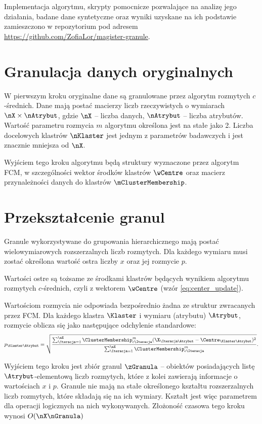 \documentclass[a4paper,twoside,12pt]{book}
\begin{document}
Implementacja algorytmu, skrypty pomocnicze pozwalające na analizę jego działania, badane dane syntetyczne oraz wyniki uzyskane na ich podstawie zamieszczono w repozytorium pod adresem \url{https://github.com/ZofiaLor/magister-granule}.

\section{Granulacja danych oryginalnych}
\label{sec:granulacja-danych-oryginalnych}

W pierwszym kroku oryginalne dane są granulowane przez algorytm rozmytych $c$-średnich. Dane mają postać macierzy liczb rzeczywistych o wymiarach $\nX \times \nAtrybut$, gdzie $\nX$ -- liczba danych, $\nAtrybut$ -- liczba atrybutów. Wartość parametru rozmycia $m$ algorytmu określona jest na stałe jako 2. Liczba docelowych klastrów $\nKlaster$ jest jednym z parametrów badawczych i jest znacznie mniejsza od $\nX$. 

Wyjściem tego kroku algorytmu będą struktury wyznaczone przez algorytm FCM, w szczególności wektor środków klastrów $\wCentre$ oraz macierz przynależności danych do klastrów $\mClusterMembership$.

\section{Przekształcenie granul}
\label{sec:przeksztalcenie-granul}

Granule wykorzystywane do grupowania hierarchicznego mają postać wielowymiarowych rozszerzalnych liczb rozmytych. Dla każdego wymiaru musi zostać określona wartość ostra liczby $x$ oraz jej rozmycie $p$.

Wartości ostre są tożsame ze środkami klastrów będących wynikiem algorytmu rozmytych $c$-średnich, czyli z wektorem $\wCentre$ (wzór \ref{eq:center_update}).

Wartościom rozmycia nie odpowiada bezpośrednio żadna ze struktur zwracanych przez FCM. Dla każdego klastra $\Klaster$ i wymiaru (atrybutu) $\Atrybut$, rozmycie oblicza się jako następujące odchylenie standardowe:
\begin{align}
	p_{\Klaster \Atrybut} = \sqrt{\frac{\sum_{\Iteracja = 1}^{\nX} \ClusterMembership_{\klaster\Iteracja}^{m} (\X_{\Iteracja\Atrybut} - \Centre_{\Klaster\Atrybut})^{2}}{\sum_{\Iteracja = 1}^{\nX} \ClusterMembership_{\klaster\Iteracja}^{m}}}.
\end{align}

Wyjściem tego kroku jest zbiór granul $\zGranula$ -- obiektów posiadających listę $\Atrybut$-elementową liczb rozmytych, które z kolei zawierają informacje o wartościach $x$ i $p$. Granule nie mają na stałe określonego kształtu rozszerzalnych liczb rozmytych, które składają się na ich wymiary. Kształt jest więc parametrem dla operacji logicznych na nich wykonywanych. Złożoność czasowa tego kroku wynosi $O(\nX\nGranula)$
\end{document}
